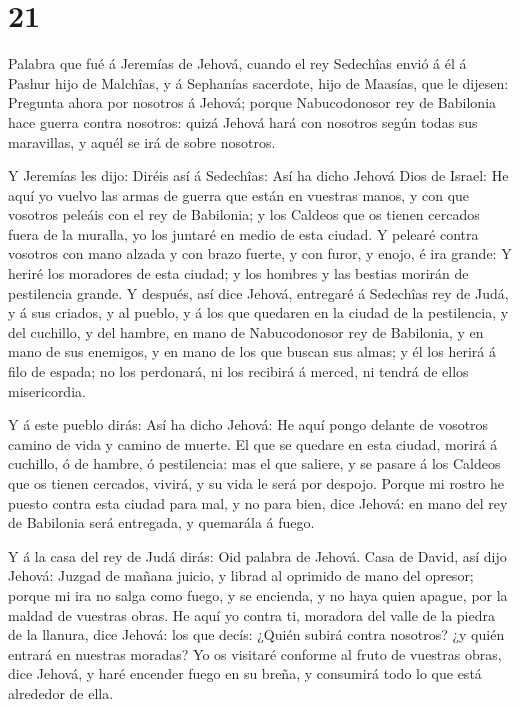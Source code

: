 \hypertarget{section-20}{%
\section{21}\label{section-20}}

 Palabra que fué á Jeremías de Jehová, cuando el rey
Sedechîas envió á él á Pashur hijo de Malchîas, y á Sephanías sacerdote,
hijo de Maasías, que le dijesen:  Pregunta ahora por
nosotros á Jehová; porque Nabucodonosor rey de Babilonia hace guerra
contra nosotros: quizá Jehová hará con nosotros según todas sus
maravillas, y aquél se irá de sobre nosotros.

 Y Jeremías les dijo: Diréis así á Sedechîas: 
Así ha dicho Jehová Dios de Israel: He aquí yo vuelvo las armas de
guerra que están en vuestras manos, y con que vosotros peleáis con el
rey de Babilonia; y los Caldeos que os tienen cercados fuera de la
muralla, yo los juntaré en medio de esta ciudad.  Y pelearé
contra vosotros con mano alzada y con brazo fuerte, y con furor, y
enojo, é ira grande:  Y heriré los moradores de esta ciudad;
y los hombres y las bestias morirán de pestilencia grande. 
Y después, así dice Jehová, entregaré á Sedechîas rey de Judá, y á sus
criados, y al pueblo, y á los que quedaren en la ciudad de la
pestilencia, y del cuchillo, y del hambre, en mano de Nabucodonosor rey
de Babilonia, y en mano de sus enemigos, y en mano de los que buscan sus
almas; y él los herirá á filo de espada; no los perdonará, ni los
recibirá á merced, ni tendrá de ellos misericordia.

 Y á este pueblo dirás: Así ha dicho Jehová: He aquí pongo
delante de vosotros camino de vida y camino de muerte.  El
que se quedare en esta ciudad, morirá á cuchillo, ó de hambre, ó
pestilencia: mas el que saliere, y se pasare á los Caldeos que os tienen
cercados, vivirá, y su vida le será por despojo.  Porque mi
rostro he puesto contra esta ciudad para mal, y no para bien, dice
Jehová: en mano del rey de Babilonia será entregada, y quemarála á
fuego.

 Y á la casa del rey de Judá dirás: Oid palabra de Jehová.
 Casa de David, así dijo Jehová: Juzgad de mañana juicio, y
librad al oprimido de mano del opresor; porque mi ira no salga como
fuego, y se encienda, y no haya quien apague, por la maldad de vuestras
obras.  He aquí yo contra ti, moradora del valle de la
piedra de la llanura, dice Jehová: los que decís: ¿Quién subirá contra
nosotros? ¿y quién entrará en nuestras moradas?  Yo os
visitaré conforme al fruto de vuestras obras, dice Jehová, y haré
encender fuego en su breña, y consumirá todo lo que está alrededor de
ella.

